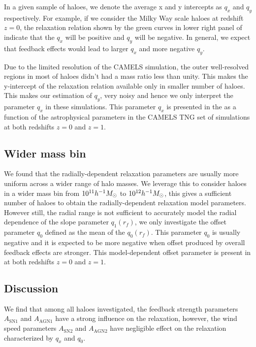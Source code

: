 In a given sample of haloes, we denote the average x and y intercepts as $q_x$ and $q_y$ respectively. For example, if we consider the Milky Way scale haloes at redshift $z=0$, the relaxation relation shown by the green curves in lower right panel of  indicate that the $q_x$ will be positive and $q_y$ will be negative. In general, we expect that feedback effects would lead to larger $q_x$ and more negative $q_y$.

Due to the limited resolution of the CAMELS simulation, the outer well-resolved regions in most of haloes didn't had a mass ratio less than unity. This makes the y-intercept of the relaxation relation available only in smaller number of haloes. This makes our estimation of $q_y$, very noisy and hence we only interpret the parameter $q_x$ in these simulations. This parameter $q_x$ is presented in the  as a function of the astrophysical parameters in the CAMELS TNG set of simulations at both redshifts $z=0$ and $z=1$.

\subsection*{Wider mass bin}
We found that the radially-dependent relaxation parameters are usually more uniform across a wider range of halo masses. We leverage this to consider haloes in a wider mass bin from $10^{11}h^{-1}M_{\odot}$ to $10^{12}h^{-1}M_{\odot}$, this gives a sufficient number of haloes to obtain the radially-dependent relaxation model parameters.
However still, the radial range is not sufficient to accurately model the radial dependence of the slope parameter $q_1(r_f)$, we only investigate the offset parameter $q_0$ defined as the mean of the $q_0(r_f)$. This parameter $q_0$ is usually negative and it is expected to be more negative when offset produced by overall feedback effects are stronger. This model-dependent offset parameter is present in  at both redshifts $z=0$ and $z=1$.

\subsection*{Discussion}
We find that among all haloes investigated, the feedback strength parameters $A_{\mathrm{SN1}}$ and $A_{\mathrm{AGN1}}$ have a strong influence on the relaxation, however, the wind speed parameters $A_{\mathrm{SN2}}$ and $A_{\mathrm{AGN2}}$ have negligible effect on the relaxation characterized by $q_x$ and $q_0$. 

